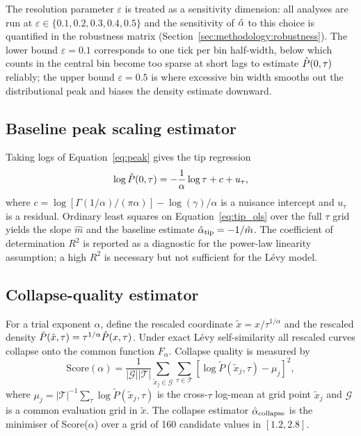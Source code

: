 \documentclass[12pt,a4paper]{article}
\begin{document}
The resolution parameter $\varepsilon$ is treated as a sensitivity dimension:
all analyses are run at $\varepsilon\in\{0.1,0.2,0.3,0.4,0.5\}$ and the
sensitivity of $\hat{\alpha}$ to this choice is quantified in the robustness matrix
(Section~\ref{sec:methodology:robustness}).
The lower bound $\varepsilon=0.1$ corresponds to one tick per bin half-width,
below which counts in the central bin become too sparse at short lags to
estimate $\hat{P}(0,\tau)$ reliably; the upper bound $\varepsilon=0.5$ is where
excessive bin width smooths out the distributional peak and biases the density
estimate downward.

\subsection{Baseline peak scaling estimator}
\label{sec:methodology:tip}

Taking logs of Equation~\eqref{eq:peak} gives the tip regression
\begin{equation}
  \log\hat{P}(0,\tau)
  = -\frac{1}{\alpha}\log\tau + c + u_\tau,
  \label{eq:tip_ols}
\end{equation}
where $c = \log[\Gamma(1/\alpha)/(\pi\alpha)] - \log(\gamma)/\alpha$ is a
nuisance intercept and $u_\tau$ is a residual. Ordinary least squares on
Equation~\eqref{eq:tip_ols} over the full $\tau$ grid yields the slope
$\hat{m}$ and the baseline estimate $\hat{\alpha}_{\mathrm{tip}} = -1/\hat{m}$.
The coefficient of determination $R^2$ is reported as a diagnostic for the
power-law linearity assumption; a high $R^2$ is necessary but not sufficient
for the Lévy model.

\subsection{Collapse-quality estimator}
\label{sec:methodology:collapse}

For a trial exponent $\alpha$, define the rescaled coordinate
$\tilde{x} = x/\tau^{1/\alpha}$ and the rescaled density
$\tilde{P}(\tilde{x},\tau) = \tau^{1/\alpha}\hat{P}(x,\tau)$. Under exact Lévy
self-similarity all rescaled curves collapse onto the common function
$F_\alpha$. Collapse quality is measured by
\begin{equation}
  \mathrm{Score}(\alpha)
  = \frac{1}{|\mathcal{G}||\mathcal{T}|}
    \sum_{\tilde{x}_j\in\mathcal{G}}
    \sum_{\tau\in\mathcal{T}}
    \!\left[\log\tilde{P}(\tilde{x}_j,\tau) - \mu_j\right]^2,
  \label{eq:score}
\end{equation}
where $\mu_j = |\mathcal{T}|^{-1}\sum_\tau\log\tilde{P}(\tilde{x}_j,\tau)$ is
the cross-$\tau$ log-mean at grid point $\tilde{x}_j$ and $\mathcal{G}$ is a
common evaluation grid in $\tilde{x}$. The collapse estimator
$\hat{\alpha}_{\mathrm{collapse}}$ is the minimiser of Score($\alpha$) over a grid
of 160 candidate values in $[1.2,2.8]$.
\end{document}
